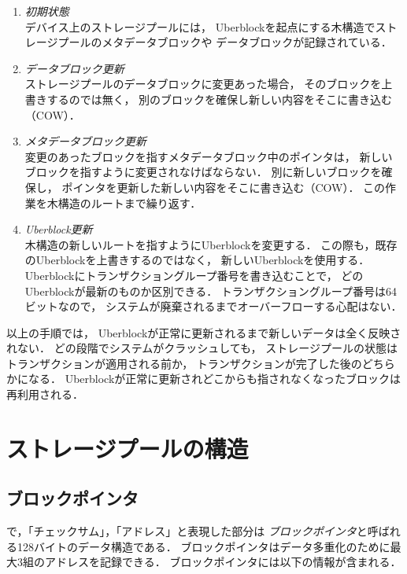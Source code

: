 \begin{enumerate}
\item \emph{初期状態} \\
  デバイス上のストレージプールには，
  Uberblockを起点にする木構造でストレージプールのメタデータブロックや
  データブロックが記録されている．
\item \emph{データブロック更新} \\
  ストレージプールのデータブロックに変更あった場合，
  そのブロックを上書きするのでは無く，
  別のブロックを確保し新しい内容をそこに書き込む（COW）．
\item \emph{メタデータブロック更新} \\
  変更のあったブロックを指すメタデータブロック中のポインタは，
  新しいブロックを指すように変更されなけばならない．
  別に新しいブロックを確保し，
  ポインタを更新した新しい内容をそこに書き込む（COW）．
  この作業を木構造のルートまで繰り返す．
\item \emph{Uberblock更新} \\
  木構造の新しいルートを指すようにUberblockを変更する．
  この際も，既存のUberblockを上書きするのではなく，
  新しいUberblockを使用する．
  Uberblockにトランザクショングループ番号を書き込むことで，
  どのUberblockが最新のものか区別できる．
  トランザクショングループ番号は64ビットなので，
  システムが廃棄されるまでオーバーフローする心配はない．
\end{enumerate}

以上の手順では，
Uberblockが正常に更新されるまで新しいデータは全く反映されない．
どの段階でシステムがクラッシュしても，
ストレージプールの状態はトランザクションが適用される前か，
トランザクションが完了した後のどちらかになる．
Uberblockが正常に更新されどこからも指されなくなったブロックは再利用される．

\section{ストレージプールの構造}

\subsection{ブロックポインタ}
で，「チェックサム」，「アドレス」と表現した部分は
\emph{ブロックポインタ}と呼ばれる128バイトのデータ構造である．
ブロックポインタはデータ多重化のために最大3組のアドレスを記録できる．
ブロックポインタには以下の情報が含まれる．

